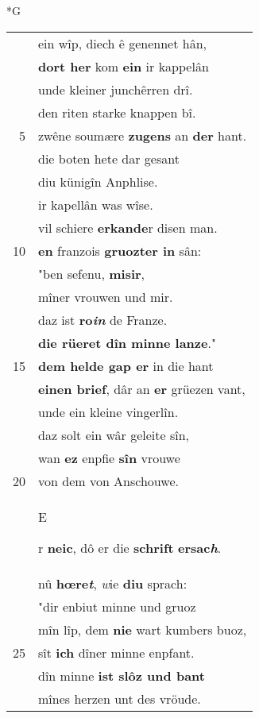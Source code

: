 \documentclass[8pt,a4paper,notitlepage]{article}
\begin{document}
\begin{table}[ht]
\begin{minipage}[t]{0.5\linewidth}
\small
\begin{center}*G
\end{center}
\begin{tabular}{rl}
 & ein wîp, diech ê genennet hân,\\ 
 & \textbf{dort her} kom \textbf{ein} ir kappelân\\ 
 & unde kleiner junchêrren drî.\\ 
 & den riten starke knappen bî.\\ 
5 & zwêne soumære \textbf{zugens} an \textbf{der} hant.\\ 
 & die boten hete dar gesant\\ 
 & diu künigîn Anphlise.\\ 
 & ir kapellân was wîse.\\ 
 & vil schiere \textbf{erkande}r disen man.\\ 
10 & \textbf{en} franzois \textbf{gruozter in} sân:\\ 
 & "ben sefenu, \textbf{misir},\\ 
 & mîner vrouwen und mir.\\ 
 & daz ist \textbf{ro\textit{in}} de Franze.\\ 
 & \textbf{die rüeret dîn minne lanze}."\\ 
15 & \textbf{dem helde gap er} in die hant\\ 
 & \textbf{einen brief}, dâr an \textbf{er} grüezen vant,\\ 
 & unde ein kleine vingerlîn.\\ 
 & daz solt ein wâr geleite sîn,\\ 
 & wan \textbf{ez} enpfie \textbf{sîn} vrouwe\\ 
20 & von dem von Anschouwe.\\ 
 & \begin{large}E\end{large}r \textbf{neic}, dô er die \textbf{schrift} \textbf{ersac\textit{h}}.\\ 
 & nû \textbf{hœre\textit{t}}, \textit{w}ie \textbf{diu} sprach:\\ 
 & "dir enbiut minne und gruoz\\ 
 & mîn lîp, dem \textbf{nie} wart kumbers buoz,\\ 
25 & sît \textbf{ich} dîner minne enpfant.\\ 
 & dîn minne \textbf{ist slôz und bant}\\ 
 & mînes herzen unt des vröude.\\ 

\end{tabular}
\end{minipage}
\end{table}
\end{document}
